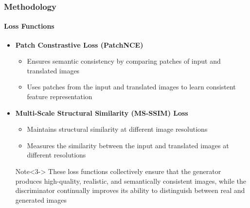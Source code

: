 \documentclass[aspectratio=169, lecture, amberg]{OTHAWbeamer}
\begin{document}
\begin{frame}[t]
    \frametitle{Methodology}
    \framesubtitle{Loss Functions}

    \begin{itemize}
        \item <1-> \textbf{Patch Constrastive Loss (PatchNCE)}
        \begin{itemize}
            \item Ensures semantic consistency by comparing patches of input and translated images
            \item Uses patches from the input and translated images to learn consistent feature representation
        
        \end{itemize}
        \item <2-> \textbf{Multi-Scale Structural Similarity (MS-SSIM) Loss}
        \begin{itemize}
            \item Maintains structural similarity at different image resolutions
            \item Measures the similarity between the input and translated images at different resolutions
        \end{itemize}
        \begin{block}{Note}<3->
            These loss functions collectively ensure that the generator produces high-quality, realistic, and semantically consistent images, while the discriminator continually improves its ability to distinguish between real and generated images
            \end{block}
    \end{itemize}
\end{frame}
\end{document}
